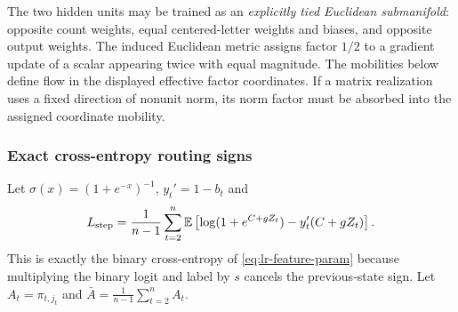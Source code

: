 The two hidden units may be trained as an \emph{explicitly tied Euclidean
submanifold}: opposite count weights, equal centered-letter weights and
biases, and opposite output weights.  The induced Euclidean metric assigns
factor $1/2$ to a gradient update of a scalar appearing twice with equal
magnitude.  The mobilities below define flow in the displayed effective factor coordinates.
If a matrix realization uses a fixed direction of nonunit norm, its norm
factor must be absorbed into the assigned coordinate mobility.

\subsubsection{Exact cross-entropy routing signs}
\label{app:weak-routing-signs}

Let $\sigma(x)=(1+e^{-x})^{-1}$, $y_t'=1-b_t$ and
\begin{equation}\label{eq:lr-logistic-risk}
 L_{\mathrm{step}}=\frac1{n-1}\sum_{t=2}^n\mathbb E
 \left[\log(1+e^{C+gZ_t})-y_t'(C+gZ_t)\right].
\end{equation}
This is exactly the binary cross-entropy of
\eqref{eq:lr-feature-param} because multiplying the binary logit and
label by $s$ cancels the previous-state sign.
Let $A_t=\pi_{t,j_t}$ and $\bar A=\frac1{n-1}\sum_{t=2}^n A_t$.

